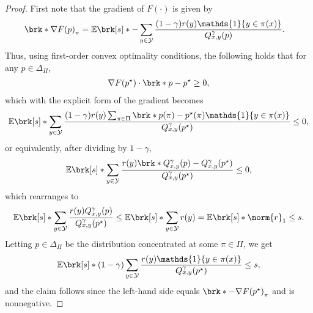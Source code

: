 \documentclass[11pt]{article}
\renewcommand{\ind}[1]{\mathds{1}\{#1\}}
\newcommand{\bbE}{\boldsymbol{\mathbb{E}}}
\renewcommand{\E}{\bbE}
\newcommand{\yprobg}[3]{Q^\gamma_{#2,#3}(#1)}
\newcommand{\rew}{r}
\newcommand{\lab}{y}
\newcommand{\calY}{\mathcal{Y}}
\newcommand{\obj}{F}
\theoremstyle{plain}
\begin{document}
\begin{proof}
    First note that the gradient of $\obj(\cdot)$ is given by
    \begin{align*}
        \brk*{\nabla \obj(p)}_\pi
        &=
        \E \brk[s]*{- \sum_{\lab \in \calY} \frac{(1-\gamma) \rew(\lab) \ind{ \lab \in \pi(x)}}{\yprobg{p}{x}{\lab}}}.
    \end{align*}
    Thus, using first-order convex optimality conditions, the following holds that for any $p \in \Delta_\Pi$,
    \begin{align*}
        \nabla \obj(p^\star) \cdot \brk*{p - p^\star} \geq 0,
    \end{align*}
    which with the explicit form of the gradient becomes
    \[
         \mathbb{E}\brk[s]*{\sum_{\lab \in \calY} \frac{(1-\gamma) \rew(\lab) \sum_{\pi \in \Pi} \brk*{p(\pi) - p^\star(\pi)} \ind{\lab \in \pi(x)}}{\yprobg{p^\star}{x}{\lab}}} 
        \le 
        0,
    \]
    or equivalently, after dividing by $1-\gamma$,
    \[
    \E \brk[s]*{\sum_{y \in \calY} \frac{\rew(\lab) \brk*{\yprobg{p}{x}{\lab} - \yprobg{p^\star}{x}{\lab}}}{\yprobg{p^\star}{x}{\lab}}} \leq 0,
    \]
    which rearranges to 
    \begin{align*}
        \E \brk[s]*{\sum_{y \in \calY}\frac{\rew(\lab) \yprobg{p}{x}{\lab}}{\yprobg{p^\star}{x}{\lab}}} \leq \E \brk[s]*{\sum_{y \in \calY} \rew(y)} = \E \brk[s]*{\norm{r}_1} \leq s.
    \end{align*}   
    Letting $p \in \Delta_\Pi$ be the distribution concentrated at some $\pi \in \Pi$, we get
    \[
        \mathbb{E}\brk[s]*{(1-\gamma) \sum_{y \in \calY}\frac{\rew(\lab) \ind{\lab \in \pi(x)}}{\yprobg{p^\star}{x}{\lab}}} \le s,                
    \]
    and the claim follows since the left-hand side equals $\brk*{- \nabla \obj(p^\star)}_\pi$ and is nonnegative.    
\end{proof}
\end{document}
